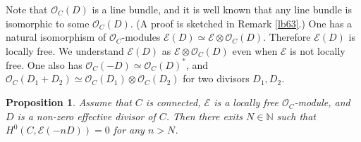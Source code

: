 \documentclass[12pt,a4paper,notitlepage]{report}
\theoremstyle{definition}
\theoremstyle{plain}
\newtheorem{pp}[df]{Proposition}
\newcommand{\scr}{\mathscr}
\numberwithin{equation}{section}
\begin{document}
Note that $\scr O_C(D)$ is a line bundle, and it is well known that any line bundle is isomorphic to some $\scr O_C(D)$. (A proof is sketched in Remark \ref{lb63}.) One has a natural isomorphism of $\scr O_C$-modules $\scr E(D)\simeq\scr E\otimes\scr O_C(D)$.  Therefore $\scr E(D)$ is locally free. We understand $\scr E(D)$ as $\scr E\otimes\scr O_C(D)$ even when $\scr E$ is not locally free. One also has $\scr O_C(-D)\simeq\scr O_C(D)^*$, and $\scr O_C(D_1+D_2)\simeq\scr O_C(D_1)\otimes\scr O_C(D_2)$ for two divisors $D_1,D_2$.



\begin{pp}\label{lb62}
Assume that $C$ is connected, $\scr E$ is a locally free $\scr O_C$-module, and  $D$ is a non-zero effective divisor of $C$. Then   there exits $N\in\mathbb N$ such that $H^0(C,\scr E(-nD))=0$ for any $n> N$.
\end{pp}
\end{document}
